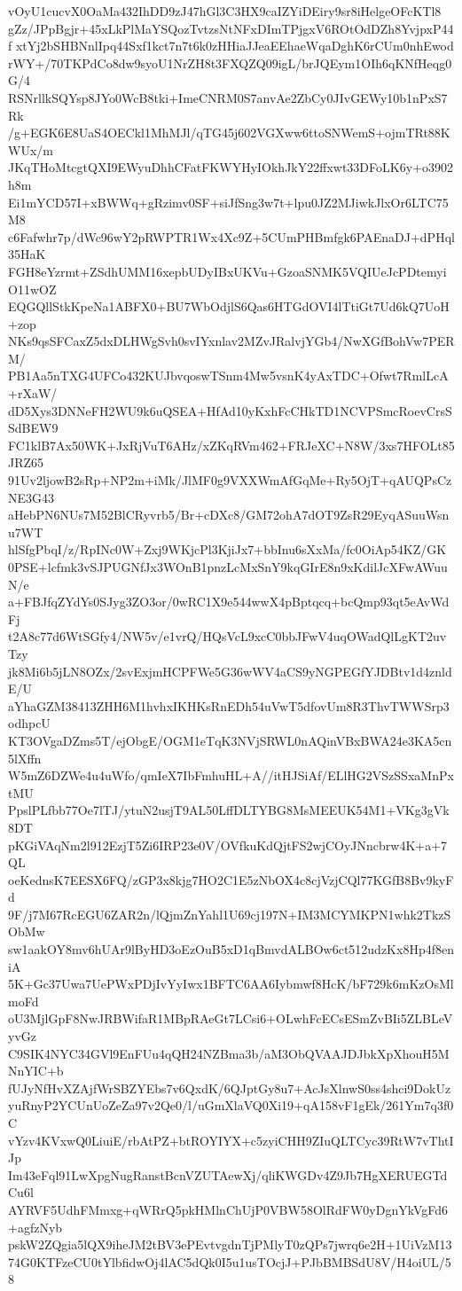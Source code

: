 vOyU1cucvX0OaMa432IhDD9zJ47hGl3C3HX9caIZYiDEiry9sr8iHelgeOFcKTl8
gZz/JPpBgjr+45xLkPlMaYSQozTvtzsNtNFxDImTPjgxV6ROtOdDZh8YvjpxP44f
xtYj2bSHBNnlIpq44Sxf1kct7n7t6k0zHHiaJJeaEEhaeWqaDghK6rCUm0nhEwod
rWY+/70TKPdCo8dw9syoU1NrZH8t3FXQZQ09igL/brJQEym1OIh6qKNfHeqg0G/4
RSNrllkSQYsp8JYo0WcB8tki+ImeCNRM0S7anvAe2ZbCy0JIvGEWy10b1nPxS7Rk
/g+EGK6E8UaS4OECkl1MhMJl/qTG45j602VGXww6ttoSNWemS+ojmTRt88KWUx/m
JKqTHoMtcgtQXI9EWyuDhhCFatFKWYHyIOkhJkY22ffxwt33DFoLK6y+o3902h8m
Ei1mYCD57I+xBWWq+gRzimv0SF+siJfSng3w7t+lpu0JZ2MJiwkJlxOr6LTC75M8
c6Fafwhr7p/dWc96wY2pRWPTR1Wx4Xc9Z+5CUmPHBmfgk6PAEnaDJ+dPHql35HaK
FGH8eYzrmt+ZSdhUMM16xepbUDyIBxUKVu+GzoaSNMK5VQIUeJcPDtemyiO11wOZ
EQGQllStkKpeNa1ABFX0+BU7WbOdjlS6Qas6HTGdOVI4lTtiGt7Ud6kQ7UoH+zop
NKs9qsSFCaxZ5dxDLHWgSvh0svIYxnlav2MZvJRalvjYGb4/NwXGfBohVw7PERM/
PB1Aa5nTXG4UFCo432KUJbvqoswTSnm4Mw5vsnK4yAxTDC+Ofwt7RmlLcA+rXaW/
dD5Xys3DNNeFH2WU9k6uQSEA+HfAd10yKxhFcCHkTD1NCVPSmcRoevCrsSSdBEW9
FC1klB7Ax50WK+JxRjVuT6AHz/xZKqRVm462+FRJeXC+N8W/3xs7HFOLt85JRZ65
91Uv2ljowB2sRp+NP2m+iMk/JlMF0g9VXXWmAfGqMe+Ry5OjT+qAUQPsCzNE3G43
aHebPN6NUs7M52BlCRyvrb5/Br+cDXc8/GM72ohA7dOT9ZsR29EyqASuuWsnu7WT
hlSfgPbqI/z/RpINc0W+Zxj9WKjcPl3KjiJx7+bbInu6sXxMa/fc0OiAp54KZ/GK
0PSE+lcfmk3vSJPUGNfJx3WOnB1pnzLcMxSnY9kqGIrE8n9xKdilJcXFwAWuuN/e
a+FBJfqZYdYs0SJyg3ZO3or/0wRC1X9e544wwX4pBptqcq+bcQmp93qt5eAvWdFj
t2A8c77d6WtSGfy4/NW5v/e1vrQ/HQsVcL9xcC0bbJFwV4uqOWadQlLgKT2uvTzy
jk8Mi6b5jLN8OZx/2svExjmHCPFWe5G36wWV4aCS9yNGPEGfYJDBtv1d4znldE/U
aYhaGZM38413ZHH6M1hvhxIKHKsRnEDh54uVwT5dfovUm8R3ThvTWWSrp3odhpcU
KT3OVgaDZms5T/ejObgE/OGM1eTqK3NVjSRWL0nAQinVBxBWA24e3KA5cn5lXffn
W5mZ6DZWe4u4uWfo/qmIeX7IbFmhuHL+A//itHJSiAf/ELlHG2VSzSSxaMnPxtMU
PpslPLfbb77Oe7lTJ/ytuN2usjT9AL50LffDLTYBG8MsMEEUK54M1+VKg3gVk8DT
pKGiVAqNm2l912EzjT5Zi6IRP23e0V/OVfkuKdQjtFS2wjCOyJNncbrw4K+a+7QL
oeKednsK7EESX6FQ/zGP3x8kjg7HO2C1E5zNbOX4c8cjVzjCQl77KGfB8Bv9kyFd
9F/j7M67RcEGU6ZAR2n/lQjmZnYahl1U69cj197N+IM3MCYMKPN1whk2TkzSObMw
sw1aakOY8mv6hUAr9lByHD3oEzOuB5xD1qBmvdALBOw6ct512udzKx8Hp4f8eniA
5K+Gc37Uwa7UePWxPDjIvYyIwx1BFTC6AA6Iybmwf8HcK/bF729k6mKzOsMlmoFd
oU3MjlGpF8NwJRBWifaR1MBpRAeGt7LCsi6+OLwhFcECsESmZvBIi5ZLBLeVyvGz
C9SIK4NYC34GVl9EnFUu4qQH24NZBma3b/aM3ObQVAAJDJbkXpXhouH5MNnYIC+b
fUJyNfHvXZAjfWrSBZYEbs7v6QxdK/6QJptGy8u7+AcJsXlnwS0ss4shci9DokUz
yuRnyP2YCUnUoZeZa97v2Qe0/l/uGmXlaVQ0Xi19+qA158vF1gEk/261Ym7q3f0C
vYzv4KVxwQ0LiuiE/rbAtPZ+btROYIYX+c5zyiCHH9ZIuQLTCyc39RtW7vThtIJp
Im43eFql91LwXpgNugRanstBcnVZUTAewXj/qliKWGDv4Z9Jb7HgXERUEGTdCu6l
AYRVF5UdhFMmxg+qWRrQ5pkHMlnChUjP0VBW58OlRdFW0yDgnYkVgFd6+agfzNyb
pskW2ZQgia5lQX9iheJM2tBV3ePEvtvgdnTjPMlyT0zQPs7jwrq6e2H+1UiVzM13
74G0KTFzeCU0tYlbfidwOj4lAC5dQk0I5u1usTOcjJ+PJbBMBSdU8V/H4oiUL/58
